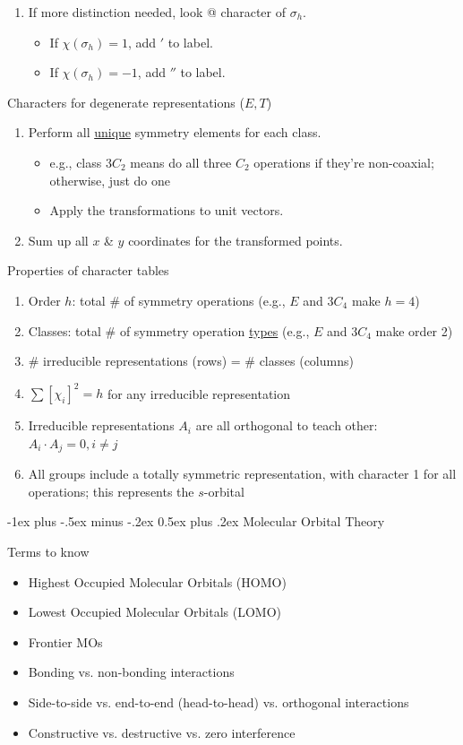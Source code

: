 \documentclass[10pt,landscape]{article}
\makeatletter
\renewcommand{\section}{\@startsection{section}{1}{0mm}%
                                {-1ex plus -.5ex minus -.2ex}%
                                {0.5ex plus .2ex}%
                                {\normalfont\large\bfseries}}
\makeatother
\begin{document}
\begin{multicols}{3}
\begin{enumerate}
	\item If more distinction needed, look @ character of $\sigma_h$.
	\begin{itemize}
		\item If $\chi(\sigma_h)=1$, add $'$ to label.
		\item If $\chi(\sigma_h)=-1$, add $''$ to label.
	\end{itemize}
\end{enumerate}

Characters for degenerate representations ($E, T$)
\begin{enumerate}
	\item Perform all \underline{unique} symmetry elements for each class.
	\begin{itemize}
		\item e.g., class $3C_2$ means do all three $C_2$ operations if they're non-coaxial; otherwise, just do one
		\item Apply the transformations to unit vectors.
	\end{itemize}
	\item Sum up all $x$ \& $y$ coordinates for the transformed points.
\end{enumerate}

Properties of character tables
\begin{enumerate}
	\item Order $h$: total \# of symmetry operations (e.g., $E$ and $3C_4$ make $h=4$)
	\item  Classes: total \# of symmetry operation \underline{types} (e.g., $E$ and $3C_4$ make order 2)
	\item \# irreducible representations (rows) = \# classes (columns)
	\item $\sum [\chi_i ]^2 = h$ for any irreducible representation
	\item Irreducible representations $A_i$ are all orthogonal to teach other: ${A_i} \cdot {A_j} = 0, i\neq j$ 
	\item All groups include a totally symmetric representation, with character 1 for all operations; this represents the $s$-orbital
\end{enumerate}

\hrulefill

\section{Molecular Orbital Theory}

Terms to know
\begin{itemize}
	\item Highest Occupied Molecular Orbitals (HOMO)
	\item Lowest Occupied Molecular Orbitals (LOMO)
	\item Frontier MOs
	\item Bonding vs. non-bonding interactions
	\item Side-to-side vs. end-to-end (head-to-head) vs. orthogonal interactions
	\item Constructive vs. destructive vs. zero interference
\end{itemize}




\end{multicols}
\end{document}
